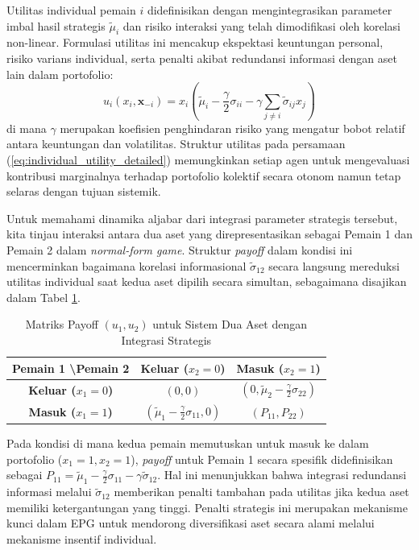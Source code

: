 Utilitas individual pemain $i$ didefinisikan dengan mengintegrasikan parameter imbal hasil strategis $\tilde{\mu}_i$ dan risiko interaksi yang telah dimodifikasi oleh korelasi non-linear. Formulasi utilitas ini mencakup ekspektasi keuntungan personal, risiko varians individual, serta penalti akibat redundansi informasi dengan aset lain dalam portofolio:
\begin{equation}
u_i(x_i, \mathbf{x}_{-i}) = x_i \left( \tilde{\mu}_i - \frac{\gamma}{2} \sigma_{ii} - \gamma \sum_{j \neq i} \tilde{\sigma}_{ij} x_j \right)
\label{eq:individual_utility_detailed}
\end{equation}
di mana $\gamma$ merupakan koefisien penghindaran risiko yang mengatur bobot relatif antara keuntungan dan volatilitas. Struktur utilitas pada persamaan (\ref{eq:individual_utility_detailed}) memungkinkan setiap agen untuk mengevaluasi kontribusi marginalnya terhadap portofolio kolektif secara otonom namun tetap selaras dengan tujuan sistemik.

Untuk memahami dinamika aljabar dari integrasi parameter strategis tersebut, kita tinjau interaksi antara dua aset yang direpresentasikan sebagai Pemain 1 dan Pemain 2 dalam \textit{normal-form game}. Struktur \textit{payoff} dalam kondisi ini mencerminkan bagaimana korelasi informasional $\tilde{\sigma}_{12}$ secara langsung mereduksi utilitas individual saat kedua aset dipilih secara simultan, sebagaimana disajikan dalam Tabel \ref{tab:payoff_matrix_game}.

\begin{table}[h!]
\centering
\caption{Matriks Payoff $(u_1, u_2)$ untuk Sistem Dua Aset dengan Integrasi Strategis}
\label{tab:payoff_matrix_game}
\begin{tabular}{|c|c|c|}
\hline
\textbf{Pemain 1 \textbackslash Pemain 2} & \textbf{Keluar ($x_2 = 0$)} & \textbf{Masuk ($x_2 = 1$)} \\ \hline
\textbf{Keluar ($x_1 = 0$)} & $(0, 0)$ & $(0, \tilde{\mu}_2 - \frac{\gamma}{2} \sigma_{22})$ \\ \hline
\textbf{Masuk ($x_1 = 1$)} & $(\tilde{\mu}_1 - \frac{\gamma}{2} \sigma_{11}, 0)$ & $(P_{11}, P_{22})$ \\ \hline
\end{tabular}
\end{table}

Pada kondisi di mana kedua pemain memutuskan untuk masuk ke dalam portofolio ($x_1 = 1, x_2 = 1$), \textit{payoff} untuk Pemain 1 secara spesifik didefinisikan sebagai $P_{11} = \tilde{\mu}_1 - \frac{\gamma}{2} \sigma_{11} - \gamma \tilde{\sigma}_{12}$. Hal ini menunjukkan bahwa integrasi redundansi informasi melalui $\tilde{\sigma}_{12}$ memberikan penalti tambahan pada utilitas jika kedua aset memiliki ketergantungan yang tinggi. Penalti strategis ini merupakan mekanisme kunci dalam EPG untuk mendorong diversifikasi aset secara alami melalui mekanisme insentif individual.

